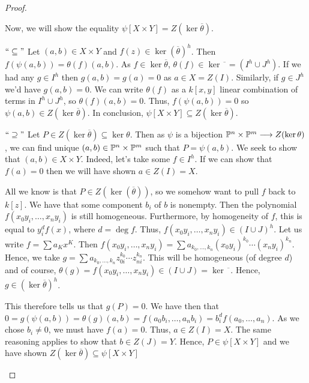 \begin{proof}
\begin{enumerate}[label = (\alph*)]
        Now, we will show the equality $\psi[X \times Y] = Z(\ker \overline \theta)$.
        
        $``\subseteq"$ Let $(a, b) \in X \times Y$ and $f(z) \in \ker(\overline \theta)^h$. Then $f(\psi(a, b)) = \theta(f)(a, b)$. As $f \in \ker \overline \theta$, $\theta(f) \in \ker \overline{\phantom{a}} = (I^h \cup J^h)$. If we had any $g \in I^h$ then $g(a, b) = g(a) = 0$ as $a \in X = Z(I)$. Similarly, if $g \in J^h$ we'd have $g(a, b) = 0$. We can write $\theta(f)$ as a $k[x, y]$ linear combination of terms in $I^h \cup J^h$, so $\theta(f)(a, b) = 0$. Thus, $f(\psi(a, b)) = 0$ so $\psi(a, b) \in Z(\ker \overline \theta)$. In conclusion, $\psi[X \times Y] \subseteq Z(\ker \overline \theta)$.

        $``\supseteq"$ Let $P \in Z(\ker \overline \theta) \subseteq \ker \theta$. Then as $\psi$ is a bijection $\P^n \times \P^m \longrightarrow Z(\ker \theta)$, we can find unique $(a, b) \in \P^n \times \P^m$ such that $P = \psi(a, b)$. We seek to show that $(a, b) \in X \times Y$. Indeed, let's take some $f \in I^h$. If we can show that $f(a) = 0$ then we will have shown $a \in Z(I) = X$.
        
        All we know is that $P \in Z(\ker(\overline \theta))$, so we somehow want to pull $f$ back to $k[z]$. We have that some component $b_i$ of $b$ is nonempty. Then the polynomial $f(x_0 y_i, \dots, x_n y_i)$ is still homogeneous. Furthermore, by homogeneity of $f$, this is equal to $y_i^d f(x)$, where $d = \deg f$. Thus, $f(x_0 y_i, \dots, x_n y_i) \in (I \cup J)^h$. Let us write $f = \sum a_K x^K$. Then $f(x_0 y_i, \dots, x_n y_i) = \sum a_{k_0, \dots, k_n} (x_0 y_i)^{k_0} \cdots (x_n y_i)^{k_n}$. Hence, we take $g = \sum a_{k_0, \dots, k_n} z_{0i}^{k_0} \cdots z_{ni}^{k_n}$. This will be homogeneous (of degree $d$) and of course, $\theta(g) = f(x_0 y_i, \dots, x_n y_i) \in (I \cup J) = \ker \overline{\phantom{a}}$. Hence, $g \in (\ker \overline \theta)^h$.

        This therefore tells us that $g(P) = 0$. We have then that $0 = g(\psi(a, b)) = \theta(g)(a, b) = f(a_0 b_i, \dots, a_n b_i) = b_i^d f(a_0, \dots, a_n)$. As we chose $b_i \neq 0$, we must have $f(a) = 0$. Thus, $a \in Z(I) = X$. The same reasoning applies to show that $b \in Z(J) = Y$. Hence, $P \in \psi[X \times Y]$ and we have shown $Z(\ker \overline \theta) \subseteq \psi[X \times Y]$
                                                                                                   

\end{enumerate}
\end{proof}
